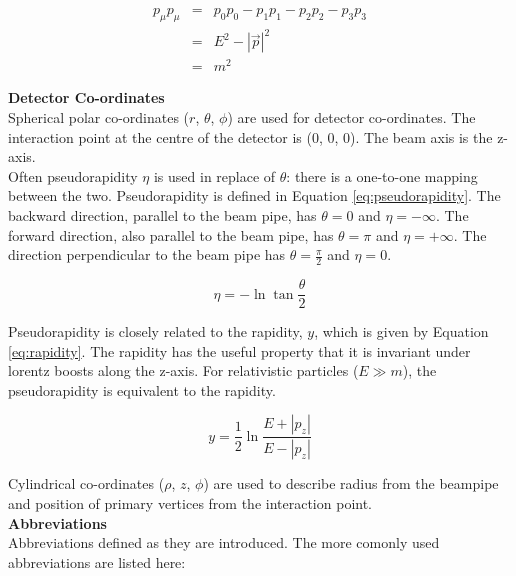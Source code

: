 \begin{eqnarray}
p_{\mu}p_{\mu} &=& p_{0}p_{0} - p_{1}p_{1} - p_{2}p_{2} - p_{3}p_{3} \nonumber
\\
&=& E^{2} - |\vec{p}|^{2} \nonumber \\
&=& m^{2}
\label{eq:greeksum}
\end{eqnarray}

{\bf Detector Co-ordinates} \\

Spherical polar co-ordinates ($r$, $\theta$, $\phi$) are used for detector
co-ordinates. The interaction point at the centre of the detector is (0, 0, 0).
The beam axis is the z-axis. \\

Often pseudorapidity $\eta$ is used in replace of $\theta$: there is a 
one-to-one mapping between the two. Pseudorapidity is defined in Equation 
\ref{eq:pseudorapidity}. The backward direction, parallel to the beam pipe, has 
$\theta = 0$ and $\eta = -\infty$. The forward direction, also parallel to the
beam pipe, has $\theta = \pi$ and $\eta = +\infty$. The direction perpendicular 
to the beam pipe has $\theta = \frac{\pi}{2}$ and $\eta = 0$. 

\begin{equation}
\eta = -\ln\tan\frac{\theta}{2}
\label{eq:pseudorapidity}
\end{equation}

Pseudorapidity is closely related to the rapidity, $y$, which is given by
Equation \ref{eq:rapidity}. The rapidity has the useful property that it is
invariant under lorentz boosts along the z-axis. For relativistic particles ($E 
\gg m$), the pseudorapidity is equivalent to the rapidity.

\begin{equation}
y = \frac{1}{2}\ln\frac{E + |p_{z}|}{E - |p_{z}|}
\label{eq:rapidity}
\end{equation}

Cylindrical co-ordinates ($\rho$, $z$, $\phi$) are used to describe radius from 
the beampipe and position of primary vertices from the interaction point. \\

{\bf Abbreviations} \\

Abbreviations defined as they are introduced. The more comonly used
abbreviations are listed here:

